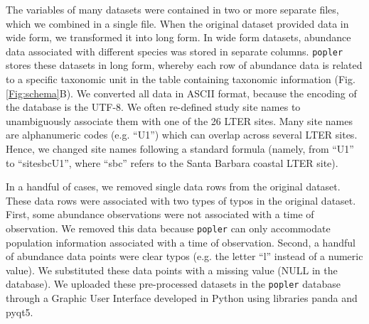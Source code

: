 \documentclass{article}\usepackage[]{graphicx}\usepackage[]{color}
\begin{document}
The variables of many datasets were contained in two or more separate files, which we combined in a single file. When the original dataset provided data in wide form, we transformed it into long form. In wide form datasets, abundance data associated with different species was stored in separate columns. \texttt{popler} stores these datasets in long form, whereby each row of abundance data is related to a specific taxonomic unit in the table containing taxonomic information (Fig. \ref{Fig:schema}B). We converted all data in ASCII format, because the encoding of the database is the UTF-8. We often re-defined study site names to unambiguously associate them with one of the 26 LTER sites. Many site names are alphanumeric codes (e.g. ``U1'') which can overlap across several LTER sites. Hence, we changed site names following a standard formula (namely, from ``U1'' to ``site\textunderscore sbc\textunderscore U1'', where ``sbc'' refers to the Santa Barbara coastal LTER site).

In a handful of cases, we removed single data rows from the original dataset. These data rows were associated with two types of typos in the original dataset. First, some abundance observations were not associated with a time of observation. We removed this data because \texttt{popler} can only accommodate population information associated with a time of observation. Second, a handful of abundance data points were clear typos (e.g. the letter ``l'' instead of a numeric value). We substituted these data points with a missing value (NULL in the database). We uploaded these pre-processed datasets in the \texttt{popler} database through a Graphic User Interface developed in Python using libraries panda and pyqt5.

\newpage
\setcounter{table}{0}
\renewcommand{\thetable}{S\arabic{table}}
\end{document}
